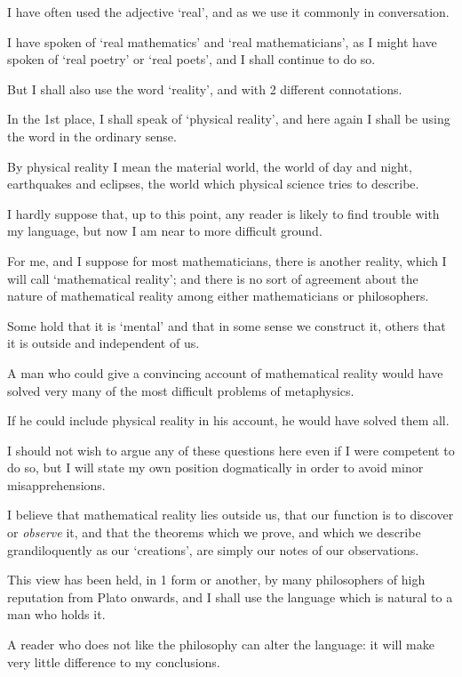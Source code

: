 \documentclass{article}
\numberwithin{equation}{section}
\begin{document}
%
I have often used the adjective `real', and as we use it commonly in conversation.

I have spoken of `real mathematics' and `real mathematicians', as I might have spoken of `real poetry' or `real poets', and I shall continue to do so.

But I shall also use the word `reality', and with 2 different connotations.

%
In the 1st place, I shall speak of `physical reality', and here again I shall be using the word in the ordinary sense.

By physical reality I mean the material world, the world of day and night, earthquakes and eclipses, the world which physical science tries to describe.

%
I hardly suppose that, up to this point, any reader is likely to find trouble with my language, but now I am near to more difficult ground.

For me, and I suppose for most mathematicians, there is another reality, which I will call `mathematical reality'; and there is no sort of agreement about the nature of mathematical reality among either mathematicians or philosophers.

Some hold that it is `mental' and that in some sense we construct it, others that it is outside and independent of us.

A man who could give a convincing account of mathematical reality would have solved very many of the most difficult problems of metaphysics.

If he could include physical reality in his account, he would have solved them all.

%
I should not wish to argue any of these questions here even if I were competent to do so, but I will state my own position dogmatically in order to avoid minor misapprehensions.

I believe that mathematical reality lies outside us, that our function is to discover or \textit{observe} it, and that the theorems which we prove, and which we describe grandiloquently as our `creations', are simply our notes of our observations.

This view has been held, in 1 form or another, by many philosophers of high reputation from Plato onwards, and I shall use the language which is natural to a man who holds it.

A reader who does not like the philosophy can alter the language: it will make very little difference to my conclusions.
\end{document}
